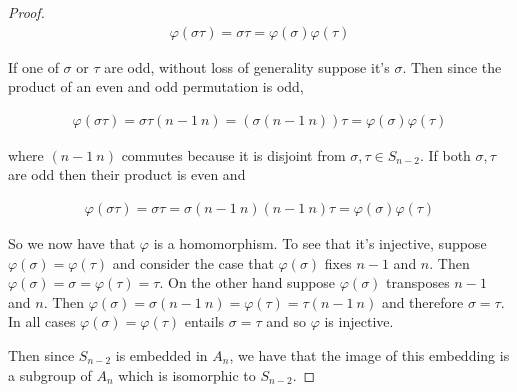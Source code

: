 \documentclass{exam}
\begin{document}
\begin{questions}
\begin{proof}
  \begin{align*}
    \varphi(\sigma\tau) = \sigma\tau = \varphi(\sigma)\varphi(\tau)
  \end{align*}

  If one of $\sigma$ or $\tau$ are odd, without loss of generality suppose it's $\sigma$.  Then since the product of an even and odd permutation is odd,

  \begin{align*}
    \varphi(\sigma\tau) = \sigma\tau(n-1\ n) = (\sigma(n-1\ n))\tau = \varphi(\sigma)\varphi(\tau)
  \end{align*}

  where $(n-1\ n)$ commutes because it is disjoint from $\sigma,\tau\in S_{n-2}$.  If both $\sigma,\tau$ are odd then their product is even and

  \begin{align*}
    \varphi(\sigma\tau) = \sigma\tau = \sigma(n-1\ n)(n-1\ n)\tau = \varphi(\sigma)\varphi(\tau)
  \end{align*}

  So we now have that $\varphi$ is a homomorphism.  To see that it's injective, suppose $\varphi(\sigma)=\varphi(\tau)$ and consider the case that $\varphi(\sigma)$ fixes $n-1$ and $n$.  Then $\varphi(\sigma) = \sigma = \varphi(\tau)=\tau$.  On the other hand suppose $\varphi(\sigma)$ transposes $n-1$ and $n$.  Then $\varphi(\sigma) = \sigma(n-1\ n) = \varphi(\tau) = \tau(n-1\ n)$ and therefore $\sigma=\tau$.  In all cases $\varphi(\sigma)=\varphi(\tau)$ entails $\sigma=\tau$ and so $\varphi$ is injective.

  Then since $S_{n-2}$ is embedded in $A_n$, we have that the image of this embedding is a subgroup of $A_n$ which is isomorphic to $S_{n-2}$.
\end{proof}


\end{questions}
\end{document}
